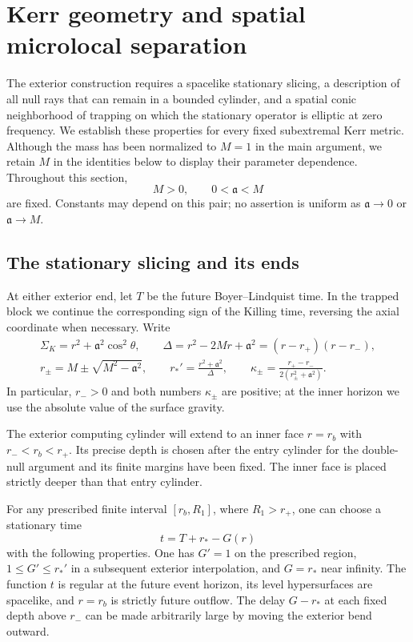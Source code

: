 \section{Kerr geometry and spatial microlocal separation}
\label{sec:geometry}

The exterior construction requires a spacelike stationary slicing, a
description of all null rays that can remain in a bounded cylinder, and a
spatial conic neighborhood of trapping on which the stationary operator is
elliptic at zero frequency.  We establish these properties for every fixed
subextremal Kerr metric.  Although the mass has been normalized to $M=1$ in
the main argument, we retain $M$ in the identities below to display their
parameter dependence.  Throughout this section,
\[
 M>0,\qquad 0<\mathfrak a<M
\]
are fixed.  Constants may depend on this pair; no assertion is uniform as
$\mathfrak a\to0$ or $\mathfrak a\to M$.

\subsection{The stationary slicing and its ends}

At either exterior end, let $T$ be the future Boyer--Lindquist time.  In the
trapped block we continue the corresponding sign of the Killing time,
reversing the axial coordinate when necessary.  Write
\begin{equation}
 \begin{gathered}
 \Sigma_K=r^2+\mathfrak a^2\cos^2\theta,\qquad
 \Delta=r^2-2Mr+\mathfrak a^2=(r-r_+)(r-r_-),\\
 r_\pm=M\pm\sqrt{M^2-\mathfrak a^2},\qquad
 r_*'=\frac{r^2+\mathfrak a^2}{\Delta},\qquad
 \kappa_\pm=\frac{r_+-r_-}{2(r_\pm^2+\mathfrak a^2)}.
 \end{gathered}
 \label{geo:kerr-functions}
\end{equation}
In particular, $r_->0$ and both numbers $\kappa_\pm$ are positive; at the
inner horizon we use the absolute value of the surface gravity.

The exterior computing cylinder will extend to an inner face $r=r_b$ with
$r_-<r_b<r_+$.  Its precise depth is chosen after the entry cylinder for the
double-null argument and its finite margins have been fixed.  The inner
face is placed strictly deeper than that entry cylinder.

\begin{lemma}
\label{geo:slicing}
For any prescribed finite interval $[r_b,R_1]$, where $R_1>r_+$,
one can choose a stationary time
\begin{equation}
 t=T+r_*-G(r)
 \label{geo:time}
\end{equation}
with the following properties.  One has $G'=1$ on the prescribed region,
$1\leq G'\leq r_*'$ in a subsequent exterior interpolation, and $G=r_*$
near infinity.  The function $t$ is regular at the future event horizon,
its level hypersurfaces are spacelike, and $r=r_b$ is strictly future
outflow.  The delay $G-r_*$ at each fixed depth above $r_-$ can be made
arbitrarily large by moving the exterior bend outward.
\end{lemma}

